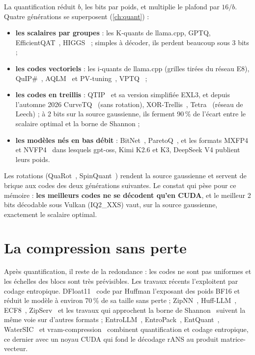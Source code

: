 La quantification réduit $b$, les bits par poids, et multiplie le plafond par $16/b$. Quatre générations se superposent (\cref{ch:quant}) :
\begin{itemize}
\item \textbf{les scalaires par groupes} : les K-quants de llama.cpp, GPTQ, EfficientQAT~\cite{efficientqat2024}, HIGGS~\cite{higgs2024} ; simples à décoder, ils perdent beaucoup sous 3 bits ;
\item \textbf{les codes vectoriels} : les i-quants de llama.cpp (grilles tirées du réseau E8), QuIP\#~\cite{quipsharp2024}, AQLM~\cite{aqlm2024} et PV-tuning~\cite{pvtuning2024}, VPTQ~\cite{vptq2024} ;
\item \textbf{les codes en treillis} : QTIP~\cite{qtip2024} et sa version simplifiée EXL3, et depuis l'automne 2026 CurveTQ~\cite{curvetq2026} (sans rotation), XOR-Trellis~\cite{xortrellis2026}, Tetra~\cite{tetra2026} (réseau de Leech) ; à 2 bits sur la source gaussienne, ils ferment 90\,\% de l'écart entre le scalaire optimal et la borne de Shannon ;
\item \textbf{les modèles nés en bas débit} : BitNet~\cite{bitnet2024}, ParetoQ~\cite{paretoq2025}, et les formats MXFP4 et NVFP4~\cite{ocpmx2023,nvfp4pretrain2025} dans lesquels gpt-oss, Kimi K2.6 et K3, DeepSeek V4 publient leurs poids.
\end{itemize}
Les rotations (QuaRot~\cite{quarot2024}, SpinQuant~\cite{spinquant2024}) rendent la source gaussienne et servent de brique aux codes des deux générations suivantes. Le constat qui pèse pour ce mémoire : \textbf{les meilleurs codes ne se décodent qu'en CUDA}, et le meilleur 2 bits décodable sous Vulkan (IQ2\_XXS) vaut, sur la source gaussienne, exactement le scalaire optimal.

\section{La compression sans perte}\label{sec:etat-sans-perte}

Après quantification, il reste de la redondance : les codes ne sont pas uniformes et les échelles des blocs sont très prévisibles. Les travaux récents l'exploitent par codage entropique. DFloat11~\cite{zhang2025dfloat11} code par Huffman l'exposant des poids BF16 et réduit le modèle à environ 70\,\% de sa taille sans perte ; ZipNN~\cite{hershcovitch2024zipnn}, Huff-LLM~\cite{yubeaton2025huffllm}, ECF8~\cite{yang2025ecf8}, ZipServ~\cite{zipserv2026} et les travaux qui approchent la borne de Shannon~\cite{shannonbound2026} suivent la même voie sur d'autres formats ; EntroLLM~\cite{entrollm2025}, EntroPack~\cite{entropack2026}, EntQuant~\cite{putzky2026entquant}, WaterSIC~\cite{lifar2026watersic} et vram-compression~\cite{nuri2026vramcompression} combinent quantification et codage entropique, ce dernier avec un noyau CUDA qui fond le décodage rANS au produit matrice-vecteur.

